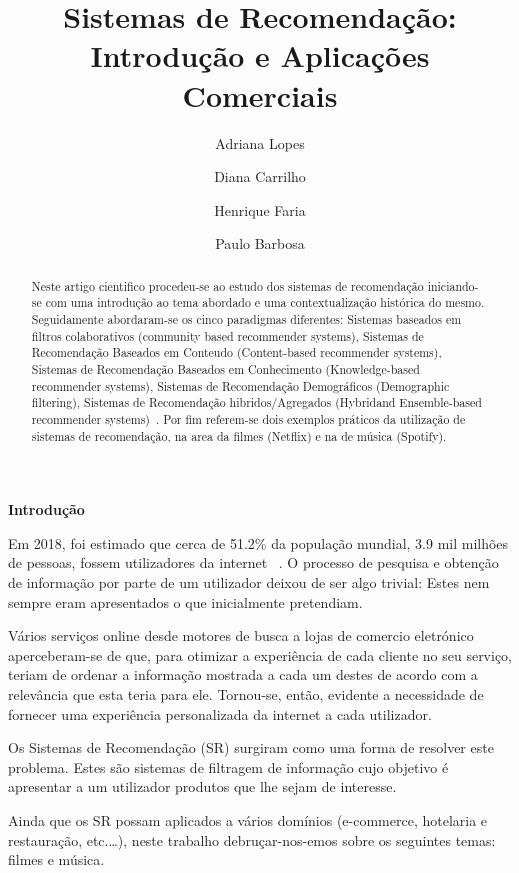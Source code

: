 %
\title{Sistemas de Recomendação: Introdução e Aplicações Comerciais}
%
%
\author{Adriana Lopes \and Diana Carrilho \and Henrique Faria \and Paulo Barbosa}
%
%
%
\maketitle              %
%
\begin{abstract}
Neste artigo cientifico procedeu-se ao estudo dos sistemas de recomendação iniciando-se com uma introdução ao tema abordado e uma contextualização histórica do mesmo. Seguidamente abordaram-se os cinco paradigmas diferentes: Sistemas baseados em filtros colaborativos (community based recommender systems), Sistemas de Recomendação Baseados em Conteudo (Content-based recommender systems), Sistemas de Recomendação Baseados em Conhecimento
(Knowledge-based recommender systems), Sistemas de Recomendação Demográficos (Demographic filtering), Sistemas de Recomendação hibridos/Agregados (Hybridand Ensemble-based recommender systems)~\cite{ref_book1}. Por fim referem-se dois exemplos práticos da utilização de sistemas de recomendação, na area da filmes (Netflix) e na de música (Spotify).\newline

\end{abstract}
%
%
\begin{center}
\normalsize{\bfseries Introdução}\hfill 

Em 2018, foi estimado que cerca de 51.2\% da população mundial, 3.9 mil milhões de pessoas, fossem utilizadores da internet~\cite{ref_url1} . O processo de pesquisa e obtenção de informação por parte de um utilizador deixou de ser algo trivial: Estes nem sempre eram apresentados o que inicialmente pretendiam. 

Vários serviços online desde motores de busca a lojas de comercio eletrónico aperceberam-se de que, para otimizar a experiência de cada cliente no seu serviço, teriam de ordenar a informação mostrada a cada um destes de acordo com a relevância que esta teria para ele. Tornou-se, então, evidente a necessidade de fornecer uma experiência personalizada da internet a cada utilizador.  

Os Sistemas de Recomendação (SR) surgiram como uma forma de resolver este problema. Estes são sistemas de filtragem de informação cujo objetivo é apresentar a um utilizador produtos que lhe sejam de interesse. 

Ainda que os SR possam aplicados a vários domínios (e-commerce, hotelaria e restauração, etc.…), neste trabalho debruçar-nos-emos sobre os seguintes temas: filmes e música. 

\end{center}




